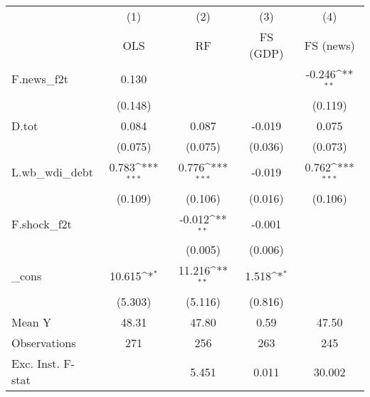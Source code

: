 {
\def\sym#1{\ifmmode^{#1}\else\(^{#1}\)\fi}
\begin{tabular}{l*{4}{c}}
\toprule
            &\multicolumn{1}{c}{(1)}&\multicolumn{1}{c}{(2)}&\multicolumn{1}{c}{(3)}&\multicolumn{1}{c}{(4)}\\
            &\multicolumn{1}{c}{OLS}&\multicolumn{1}{c}{RF}&\multicolumn{1}{c}{FS (GDP)}&\multicolumn{1}{c}{FS (news)}\\
\midrule
F.news\_f2t  &       0.130         &                     &                     &      -0.246\sym{**} \\
            &     (0.148)         &                     &                     &     (0.119)         \\
\addlinespace
D.tot       &       0.084         &       0.087         &      -0.019         &       0.075         \\
            &     (0.075)         &     (0.075)         &     (0.036)         &     (0.073)         \\
\addlinespace
L.wb\_wdi\_debt&       0.783\sym{***}&       0.776\sym{***}&      -0.019         &       0.762\sym{***}\\
            &     (0.109)         &     (0.106)         &     (0.016)         &     (0.106)         \\
\addlinespace
F.shock\_f2t &                     &      -0.012\sym{**} &      -0.001         &                     \\
            &                     &     (0.005)         &     (0.006)         &                     \\
\addlinespace
\_cons      &      10.615\sym{*}  &      11.216\sym{**} &       1.518\sym{*}  &                     \\
            &     (5.303)         &     (5.116)         &     (0.816)         &                     \\
\midrule
Mean Y      &       48.31         &       47.80         &        0.59         &       47.50         \\
Observations&         271         &         256         &         263         &         245         \\
Exc. Inst. F-stat&                     &       5.451         &       0.011         &      30.002         \\
\bottomrule
\end{tabular}
}

